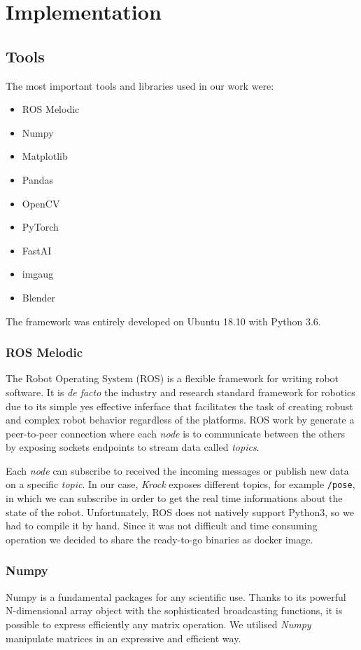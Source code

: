 \documentclass[../document.tex]{subfiles}
\begin{document}
\section{Implementation}

\subsection{Tools}
The most important tools and libraries used in our work were:

\begin{itemize}
	\item ROS Melodic
	\item Numpy
	\item Matplotlib
	\item Pandas
	\item OpenCV
	\item PyTorch
	\item FastAI
	\item imgaug
	\item Blender
\end{itemize}
The framework was entirely developed on Ubuntu 18.10 with Python 3.6.

\subsubsection{ROS Melodic}
The Robot Operating System (ROS) \cite{ROS} is a flexible framework for writing robot software. It is \emph{de facto} the industry and research standard framework for robotics due to its simple yes effective inferface that facilitates the task of creating robust and complex robot behavior regardless of the platforms. ROS work by generate a peer-to-peer connection where each \emph{node} is to communicate between the others by exposing sockets endpoints to stream data called \emph{topics}. 

Each \emph{node} can subscribe to received the incoming messages or publish new data on a specific \emph{topic}. In our case, \emph{Krock} exposes different topics, for example \texttt{/pose}, in which we can subscribe in order to get the real time informations about the state of the robot.
Unfortunately, ROS does not natively support Python3, so we had to compile it by hand. Since it was not difficult and time consuming operation we decided to share the ready-to-go binaries as docker image. 

\subsubsection{Numpy}
Numpy is a fundamental packages for any scientific use. Thanks to its powerful N-dimensional array object with the sophisticated broadcasting functions, it is possible to express efficiently any matrix operation. We utilised \emph{Numpy} manipulate matrices in an expressive and efficient way.
\end{document}
